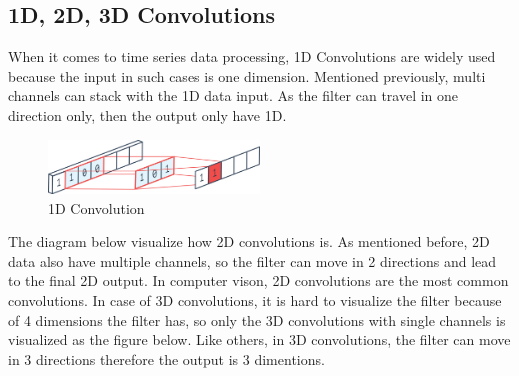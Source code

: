 \documentclass[a4paper, 12pt]{article}
\begin{document}
\subsection{1D, 2D, 3D Convolutions}
When it comes to time series data processing, 1D Convolutions are widely used because the input in such cases is one dimension. Mentioned previously, multi channels can stack with the 1D data input.
As the filter can travel in one direction only, then the output only have 1D.

\begin{figure}[H]
    \centering
    \includegraphics[width=0.5\textwidth]{1D Conv.png}
    \caption{1D Convolution}
    \label{Figure 1D}
\end{figure}

The diagram below visualize how 2D convolutions is. As mentioned before, 2D data also have multiple channels, so the filter can move in 2 directions and lead to the final 2D output. In computer vison, 2D convolutions are the most common convolutions. In case of 3D convolutions, it is hard to visualize the filter because of 4 dimensions the filter has, so only the 3D convolutions with single channels is visualized as the figure below. Like others, in 3D convolutions, the filter can move in 3 directions therefore the output is 3 dimentions.
\end{document}
